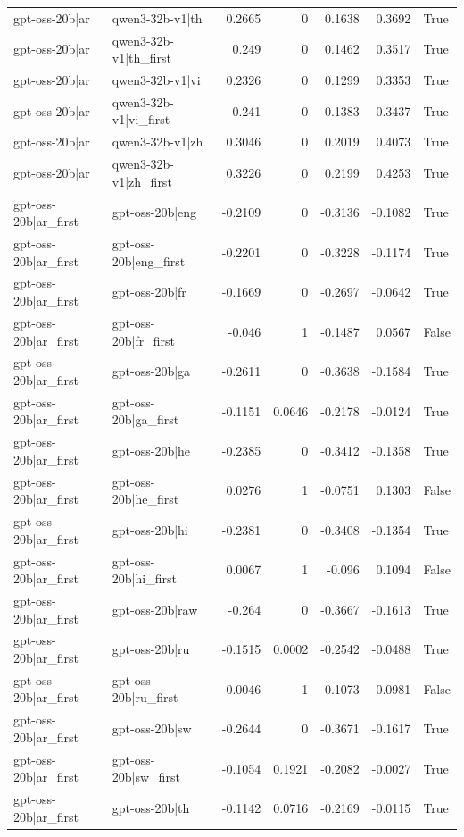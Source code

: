 \begin{table}
\begin{tabular}{l l r r r r l}
gpt-oss-20b|ar & qwen3-32b-v1|th & 0.2665 & 0 & 0.1638 & 0.3692 & True \\
gpt-oss-20b|ar & qwen3-32b-v1|th_first & 0.249 & 0 & 0.1462 & 0.3517 & True \\
gpt-oss-20b|ar & qwen3-32b-v1|vi & 0.2326 & 0 & 0.1299 & 0.3353 & True \\
gpt-oss-20b|ar & qwen3-32b-v1|vi_first & 0.241 & 0 & 0.1383 & 0.3437 & True \\
gpt-oss-20b|ar & qwen3-32b-v1|zh & 0.3046 & 0 & 0.2019 & 0.4073 & True \\
gpt-oss-20b|ar & qwen3-32b-v1|zh_first & 0.3226 & 0 & 0.2199 & 0.4253 & True \\
gpt-oss-20b|ar_first & gpt-oss-20b|eng & -0.2109 & 0 & -0.3136 & -0.1082 & True \\
gpt-oss-20b|ar_first & gpt-oss-20b|eng_first & -0.2201 & 0 & -0.3228 & -0.1174 & True \\
gpt-oss-20b|ar_first & gpt-oss-20b|fr & -0.1669 & 0 & -0.2697 & -0.0642 & True \\
gpt-oss-20b|ar_first & gpt-oss-20b|fr_first & -0.046 & 1 & -0.1487 & 0.0567 & False \\
gpt-oss-20b|ar_first & gpt-oss-20b|ga & -0.2611 & 0 & -0.3638 & -0.1584 & True \\
gpt-oss-20b|ar_first & gpt-oss-20b|ga_first & -0.1151 & 0.0646 & -0.2178 & -0.0124 & True \\
gpt-oss-20b|ar_first & gpt-oss-20b|he & -0.2385 & 0 & -0.3412 & -0.1358 & True \\
gpt-oss-20b|ar_first & gpt-oss-20b|he_first & 0.0276 & 1 & -0.0751 & 0.1303 & False \\
gpt-oss-20b|ar_first & gpt-oss-20b|hi & -0.2381 & 0 & -0.3408 & -0.1354 & True \\
gpt-oss-20b|ar_first & gpt-oss-20b|hi_first & 0.0067 & 1 & -0.096 & 0.1094 & False \\
gpt-oss-20b|ar_first & gpt-oss-20b|raw & -0.264 & 0 & -0.3667 & -0.1613 & True \\
gpt-oss-20b|ar_first & gpt-oss-20b|ru & -0.1515 & 0.0002 & -0.2542 & -0.0488 & True \\
gpt-oss-20b|ar_first & gpt-oss-20b|ru_first & -0.0046 & 1 & -0.1073 & 0.0981 & False \\
gpt-oss-20b|ar_first & gpt-oss-20b|sw & -0.2644 & 0 & -0.3671 & -0.1617 & True \\
gpt-oss-20b|ar_first & gpt-oss-20b|sw_first & -0.1054 & 0.1921 & -0.2082 & -0.0027 & True \\
gpt-oss-20b|ar_first & gpt-oss-20b|th & -0.1142 & 0.0716 & -0.2169 & -0.0115 & True \\

\end{tabular}
\end{table}
